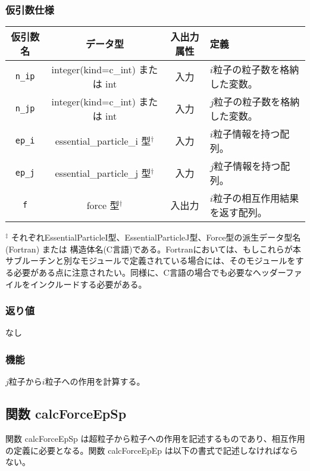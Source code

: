 \subsubsection*{仮引数仕様}
\begin{table}[H]
\begin{tabularx}{\linewidth}{cccX}
\toprule
\rowcolor{Snow2}
仮引数名 & データ型 & 入出力属性 & 定義 \\
\midrule
\texttt{n\_ip} & integer(kind=c\_int) または int & 入力 & $i$粒子の粒子数を格納した変数。\\
\texttt{n\_jp} & integer(kind=c\_int) または int & 入力 & $j$粒子の粒子数を格納した変数。\\
\texttt{ep\_i} & essential\_particle\_i 型$^{\dagger}$ & 入力 & $i$粒子情報を持つ配列。\\
\texttt{ep\_j} & essential\_particle\_j 型$^{\dagger}$ & 入力 & $j$粒子情報を持つ配列。\\
\texttt{f} & force 型$^{\dagger}$ & 入出力 & $i$粒子の相互作用結果を返す配列。\\
\bottomrule
\end{tabularx}
\begin{flushleft}
$^{\ddagger}$ それぞれEssentialParticleI型、EssentialParticleJ型、Force型の派生データ型名(Fortran) または 構造体名(C言語)である。Fortranにおいては、もしこれらが本サブルーチンと別なモジュールで定義されている場合には、そのモジュールをする必要がある点に注意されたい。同様に、C言語の場合でも必要なヘッダーファイルをインクルードする必要がある。
\end{flushleft}
\end{table}


\subsubsection*{返り値}
なし

\subsubsection*{機能}
$j$粒子から$i$粒子への作用を計算する。



\subsection{関数 calcForceEpSp}
\label{subsec:calcForceEpSP}
関数 calcForceEpSp は超粒子から粒子への作用を記述するものであり、相互作用の定義に必要となる。関数 calcForceEpEp は以下の書式で記述しなければならない。

